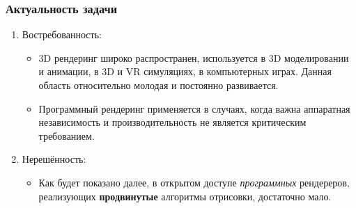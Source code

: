 \documentclass{beamer}
\begin{document}
	\begin{frame}
		\frametitle{Актуальность задачи}
		
		\begin{enumerate}
			\item<1-> Востребованность:
			\begin{itemize}
				\item<1-> 3D рендеринг широко распространен, используется в 3D моделировании и анимации, в 3D и VR симуляциях, в компьютерных играх. Данная область относительно молодая и постоянно развивается.
				\item<1-> Программный рендеринг применяется в случаях, когда важна аппаратная независимость и производительность не является критическим требованием.
			\end{itemize}
			\item<2-> Нерешённость:
			\begin{itemize}
				\item<2-> Как будет показано далее, в открытом доступе \textit{программных} рендереров, реализующих \textbf{продвинутые} алгоритмы отрисовки, достаточно мало.
			\end{itemize}
		\end{enumerate}
	\end{frame}
	
\end{document}
